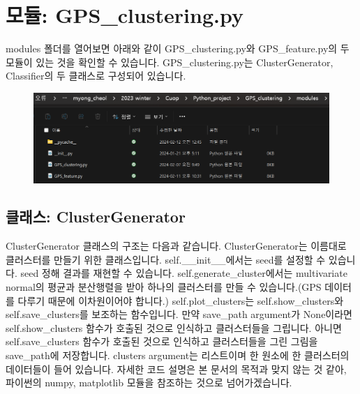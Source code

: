 \documentclass{oblivoir}
\begin{document}
  \section{모듈: GPS\_clustering.py}
  modules 폴더를 열어보면 아래와 같이 GPS\_clustering.py와 GPS\_feature.py의 두 모듈이 있는 것을 확인할 수 있습니다.
  GPS\_clustering.py는 ClusterGenerator, Classifier의 두 클래스로 구성되어 있습니다.
  \begin{figure}[H]
    \includegraphics[width=\textwidth]{GPS_clustering_1.png}
  \end{figure}

  \subsection{클래스: ClusterGenerator}
  ClusterGenerator 클래스의 구조는 다음과 같습니다.
  ClusterGenerator는 이름대로 클러스터를 만들기 위한 클래스입니다.
  self.\_\_init\_\_에서는 seed를 설정할 수 있습니다. seed 정해 결과를 재현할 수 있습니다.
  self.generate\_cluster에서는 multivariate normal의 평균과 분산행렬을 받아 하나의 클러스터를 만들 수 있습니다.(GPS 데이터를 다루기 때문에 이차원이어야 합니다.)
  self.plot\_clusters는 self.show\_clusters와 self.save\_clusters를 보조하는 함수입니다.
  만약 save\_path argument가 None이라면 self.show\_clusters 함수가 호출된 것으로 인식하고 클러스터들을 그립니다.
  아니면 self.save\_clusters 함수가 호출된 것으로 인식하고 클러스터들을 그린 그림을 save\_path에 저장합니다.
  clusters argument는 리스트이며 한 원소에 한 클러스터의 데이터들이 들어 있습니다. 
  자세한 코드 설명은 본 문서의 목적과 맞지 않는 것 같아, 파이썬의 numpy, matplotlib 모듈을 참조하는 것으로 넘어가겠습니다.
\end{document}
